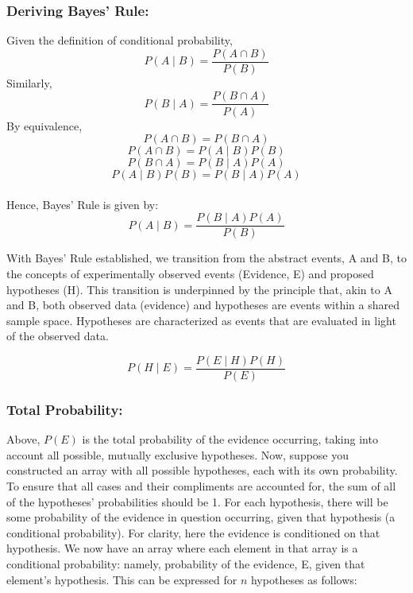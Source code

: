 \documentclass[12pt]{article}
\begin{document}
\subsubsection*{Deriving Bayes' Rule:}
Given the definition of conditional probability,
\begin{equation}
P(A \mid B) = \frac{P(A \cap B)}{P(B)}
\end{equation}
Similarly, \\
\begin{equation}
P(B \mid A) = \frac{P(B \cap A)}{P(A)}
\end{equation}
By equivalence, \\
\begin{equation}
P(A \cap B) = P(B \cap A)
\end{equation}
\begin{equation}
P(A \cap B) = P(A \mid B) P(B)
\end{equation}
\begin{equation}
P(B \cap A) = P(B \mid A) P(A)
\end{equation}
\begin{equation}
P(A \mid B) P(B) = P(B \mid A) P(A)
\end{equation} \\

\noindent Hence, Bayes' Rule is given by:
\begin{equation}
P(A \mid B) = \frac{P(B \mid A) P(A)}{P(B)}
\end{equation}

\noindent With Bayes' Rule established, we transition from the abstract events, A and B, to the concepts of experimentally observed events (Evidence, E) and proposed hypotheses (H). This transition is underpinned by the principle that, akin to A and B, both observed data (evidence) and hypotheses are events within a shared sample space. Hypotheses are characterized as events that are evaluated in light of the observed data.

\begin{equation}
P(H \mid E) = \frac{P(E \mid H) P(H)}{P(E)}
\end{equation}

\subsubsection*{Total Probability:}
\noindent Above, $P(E)$ is the total probability of the evidence occurring, taking into account all possible, mutually exclusive hypotheses. Now, suppose you constructed an array with all possible hypotheses, each with its own probability. To ensure that all cases and their compliments are accounted for, the sum of all of the hypotheses' probabilities should be 1. For each hypothesis, there will be some probability of the evidence in question occurring, given that hypothesis (a conditional probability). For clarity, here the evidence is conditioned on that hypothesis. We now have an array where each element in that array is a conditional probability: namely, probability of the evidence, E, given that element's hypothesis. This can be expressed for $n$ hypotheses as follows:
\end{document}
